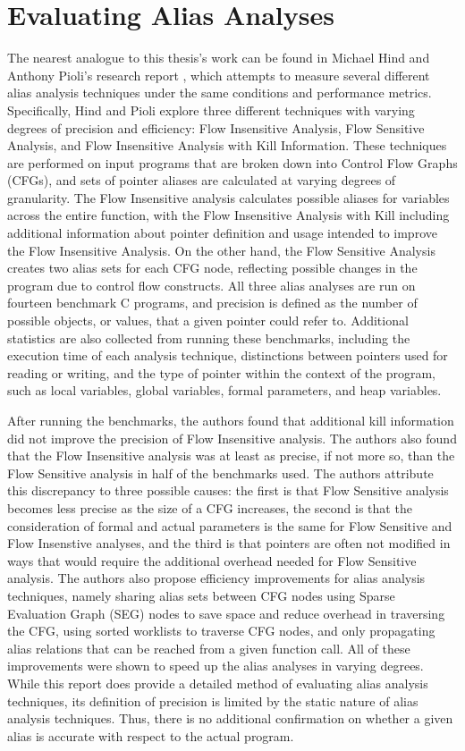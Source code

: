 \section{Evaluating Alias Analyses}
The nearest analogue to this thesis's work can be found in Michael Hind and Anthony Pioli's research report \cite{Hind_old}, which attempts to measure several different alias analysis techniques under the same conditions and performance metrics. Specifically, Hind and Pioli explore three different techniques with varying degrees of precision and efficiency: Flow Insensitive Analysis, Flow Sensitive Analysis, and Flow Insensitive Analysis with Kill Information. These techniques are performed on input programs that are broken down into Control Flow Graphs (CFGs), and sets of pointer aliases are calculated at varying degrees of granularity. The Flow Insensitive analysis calculates possible aliases for variables across the entire function, with the Flow Insensitive Analysis with Kill including additional information about pointer definition and usage intended to improve the Flow Insensitive Analysis. On the other hand, the Flow Sensitive Analysis creates two alias sets for each CFG node, reflecting possible changes in the program due to control flow constructs. All three alias analyses are run on fourteen benchmark C programs, and precision is defined as the number of possible objects, or values, that a given pointer could refer to. Additional statistics are also collected from running these benchmarks, including the execution time of each analysis technique, distinctions between pointers used for reading or writing, and the type of pointer within the context of the program, such as local variables, global variables, formal parameters, and heap variables.

After running the benchmarks, the authors found that additional kill information did not improve the precision of Flow Insensitive analysis. The authors also found that the Flow Insensitive analysis was at least as precise, if not more so, than the Flow Sensitive analysis in half of the benchmarks used. The authors attribute this discrepancy to three possible causes: the first is that Flow Sensitive analysis becomes less precise as the size of a CFG increases, the second is that the consideration of formal and actual parameters is the same for Flow Sensitive and Flow Insenstive analyses, and the third is that pointers are often not modified in ways that would require the additional overhead needed for Flow Sensitive analysis. The authors also propose efficiency improvements for alias analysis techniques, namely sharing alias sets between CFG nodes using Sparse Evaluation Graph (SEG) nodes to save space and reduce overhead in traversing the CFG, using sorted worklists to traverse CFG nodes, and only propagating alias relations that can be reached from a given function call. All of these improvements were shown to speed up the alias analyses in varying degrees. While this report does provide a detailed method of evaluating alias analysis techniques, its definition of precision is limited by the static nature of alias analysis techniques. Thus, there is no additional confirmation on whether a given alias is accurate with respect to the actual program.

